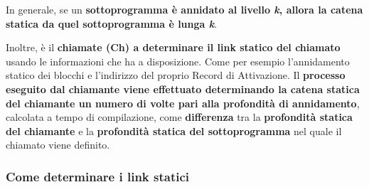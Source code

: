\documentclass[a4paper]{article}
\begin{document}
	\noindent
	In generale, se un \textbf{sottoprogramma è annidato al livello \emph{k}, allora la catena statica da quel sottoprogramma è lunga \emph{k}}.\newline
	
	\noindent
	Inoltre, è il \textbf{chiamate (Ch) a determinare il link statico del chiamato} usando le informazioni che ha a disposizione. Come per esempio l'annidamento statico dei blocchi e l'indirizzo del proprio Record di Attivazione. Il \textbf{processo eseguito dal chiamante viene effettuato determinando la catena statica del chiamante un numero di volte pari alla profondità di annidamento}, calcolata a tempo di compilazione, come \textbf{differenza} tra la \textbf{profondità statica del chiamante} e la \textbf{profondità statica del sottoprogramma} nel quale il chiamato viene definito.\newpage
	
	\subsubsection{Come determinare i link statici}
	
\end{document}
